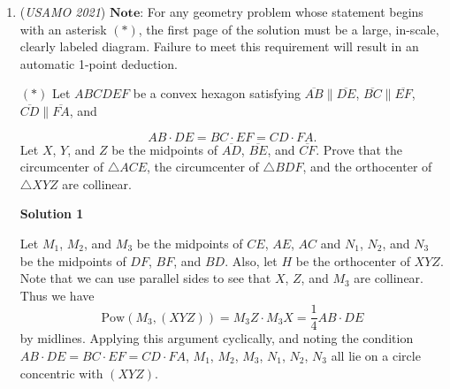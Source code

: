 \begin{enumerate}
 By AM-GM and Cauchy-Schwarz:
 \[\sum_{k=1}^n \frac{a_{2k}}{a_{2k-2}} \ge n \sqrt[n]{\prod_{k=1}^n \frac{a_{2k}}{a_{2k-2}}} = n\]
 \[\sum_{k=1}^n a_{2k-1} a_{2k+1} \le \sqrt{\sum_{k=1}^n a_{2k-1}^2} \sqrt{\sum_{k=1}^n a_{2k+1}^2} = n\]

 Thus $n \le \sum \frac{a_{2k}}{a_{2k-2}} = \sum a_{2k-1} a_{2k+1} \le n$, forcing equality everywhere:

 
            \begin{itemize}
        \item Equality in AM-GM gives $a_2 = a_4 = \dots = a_{2n} = E$.
        \item Equality in Cauchy-Schwarz gives $a_1 = a_3 = \dots = a_{2n-1} = O$.
            \end{itemize}
            From $a_2 = a_1 + a_3$ and $a_1 = \frac{1}{a_{2n}} + \frac{1}{a_2}$, we get $E = 2O$ and $O = \frac{2}{E}$.

 Solving $2O^2 = 2$ yields $O = 1$ and $E = 2$.

 Hence, $a_{2k-1} = 1$ and $a_{2k} = 2$ for all $1 \le k \le n$.

 


	\item (\textit{USAMO 2021}) $\textbf{Note:}$ For any geometry problem whose statement begins with an asterisk $(*)$, the first page of the solution must be a large, in-scale, clearly labeled diagram. Failure to meet this requirement will result in an automatic 1-point deduction.


 $(*)$ Let $ABCDEF$ be a convex hexagon satisfying $\overline{AB} \parallel \overline{DE}$, $\overline{BC} \parallel \overline{EF}$, $\overline{CD} \parallel \overline{FA}$, and

 \[AB \cdot DE = BC \cdot EF = CD \cdot FA.\]
Let $X$, $Y$, and $Z$ be the midpoints of $\overline{AD}$, $\overline{BE}$, and $\overline{CF}$. Prove that the circumcenter of $\triangle ACE$, the circumcenter of $\triangle BDF$, and the orthocenter of $\triangle XYZ$ are collinear.


 



\textbf{Solution 1}

Let $M_1$, $M_2$, and $M_3$ be the midpoints of $CE$, $AE$, $AC$ and $N_1$, $N_2$, and $N_3$ be the midpoints of $DF$, $BF$, and $BD$. Also, let $H$ be the orthocenter of $XYZ$. Note that we can use parallel sides to see that $X$, $Z$, and $M_3$ are collinear. Thus we have 
 \[\text{Pow}(M_3,(XYZ)) = M_3Z \cdot M_3X = \frac 14 AB \cdot DE\] by midlines. Applying this argument cyclically, and noting the condition $AB \cdot DE = BC \cdot EF = CD \cdot FA$, $M_1$, $M_2$, $M_3$, $N_1$, $N_2$, $N_3$ all lie on a circle concentric with $(XYZ)$. 


\end{enumerate}
